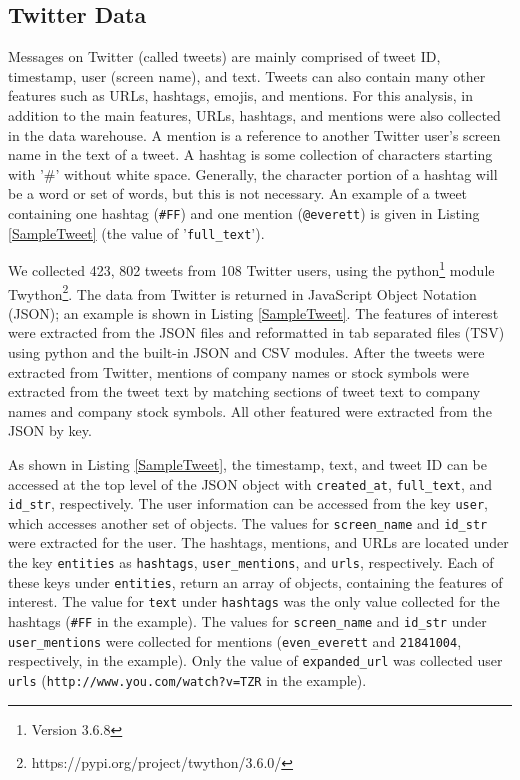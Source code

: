 \documentclass[journal]{IEEEtran}
\begin{document}
\subsection{Twitter Data}

Messages on Twitter (called tweets) are mainly comprised of
 tweet ID, timestamp, user (screen name), and text.
Tweets can also contain many other features such as
 URLs, hashtags, emojis,  and mentions.
For this analysis, in addition to the main features,
 URLs, hashtags, and mentions were also collected in the data warehouse.
A mention is a reference to another Twitter user's screen name
 in the text of a tweet.
A hashtag is some collection of characters starting with
 '\#' without white space.
Generally, the character portion of a hashtag will be a word or set of words,
 but this is not necessary.
An example of a tweet containing one hashtag (\texttt{\#FF}) and one 
mention (\texttt{@everett}) is given in Listing \ref{SampleTweet} (the value of
 '\texttt{full\_text}').

We collected 423, 802 tweets from 108 Twitter users, using the
 python\footnote{Version 3.6.8}
 module Twython\footnote{https://pypi.org/project/twython/3.6.0/}.
The data from Twitter is returned in JavaScript Object Notation (JSON); 
 an example is shown in Listing \ref{SampleTweet}.
The features of interest were extracted from the JSON files and reformatted in tab
 separated files (TSV) using python and the built-in JSON and CSV modules.
After the tweets were extracted from Twitter,
 mentions of company names or stock symbols were extracted from the tweet text by
 matching sections of tweet text to company names and company stock symbols.
All other featured were extracted from the JSON by key.

As shown in Listing \ref{SampleTweet}, the timestamp, text, and tweet ID
 can be accessed at the top level of the JSON object with \texttt{created\_at},
 \texttt{full\_text}, and \texttt{id\_str}, respectively. 
The user information can be accessed from the key \texttt{user}, 
 which accesses another set of objects. 
The values for \texttt{screen\_name} and \texttt{id\_str} were extracted for the user.
The hashtags, mentions, and URLs are located under the key \texttt{entities} as
 \texttt{hashtags}, \texttt{user\_mentions}, and \texttt{urls}, respectively.
Each of these keys under \texttt{entities}, return an array of objects,
 containing the features of interest. 
The value for \texttt{text} under \texttt{hashtags} was the only value collected
 for the hashtags (\texttt{\#FF} in the example).
The values for \texttt{screen\_name} and \texttt{id\_str} under 
 \texttt{user\_mentions} were collected for mentions (\texttt{even\_everett} and
 \texttt{21841004}, respectively, in the example).
Only the value of \texttt{expanded\_url} was collected user \texttt{urls}
 (\texttt{http://www.you.com/watch?v=TZR} in the example).
\end{document}
